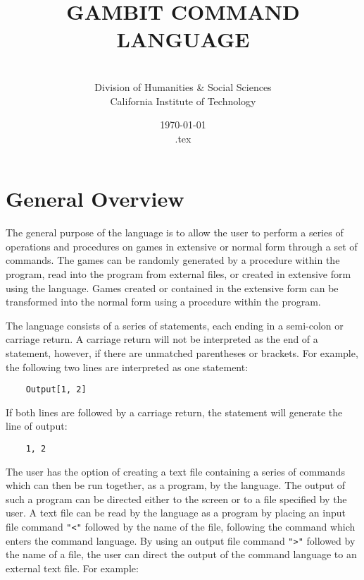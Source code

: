 \renewcommand{\baselinestretch}{.9}
\newcommand{\bd}{\begin{description}}
\newcommand{\ed}{\end{description}}


\title{GAMBIT COMMAND LANGUAGE}

\author{\ \ \\
Division of Humanities \& Social Sciences\\
California Institute of Technology }

\date{\today\\ \time \jobname.tex}

\maketitle

\section*{General Overview}

The general purpose of the language is to allow the user to perform a series of
operations and procedures on games in extensive or normal form through a set of
commands.  The games can be randomly generated by a procedure within the
program, read into the program from external files, or created in extensive
form using the language.  Games created or contained in the extensive form can
be transformed into the normal form using a procedure within the program.

The language consists of a series of statements, each ending in a semi-colon
or carriage return.  A carriage return will not be interpreted as the end of a
statement, however, if there are unmatched parentheses or brackets.  For
example, the following two lines are interpreted as one statement:

\begin{verbatim}
	Output[1, 2]
\end{verbatim}

If both lines are followed by a carriage return, the statement will generate
the line of output: 

\begin{verbatim}
	1, 2
\end{verbatim}

The user has the option of creating a text file containing a series of commands
which can then be run together, as a program, by the language.  The output of 
such a program can be directed either to the screen or to a file specified by 
the user.  A text file can be read by the language as a program by placing an 
input file command {\tt "<"} followed by the name of the file, following the 
command which enters the command language.  By using an output file command 
{\tt ">"} followed by the name of a file, the user can direct the output of 
the command language to an external text file.  For example:


